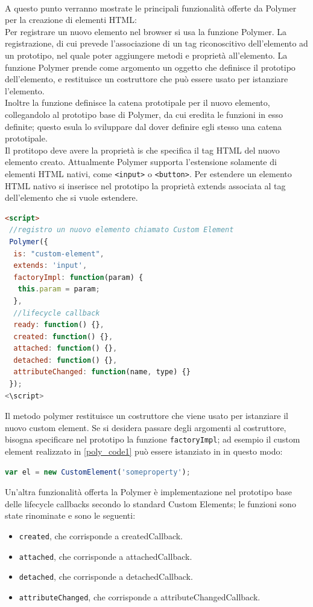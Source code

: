 \\
A questo punto verranno mostrate le principali funzionalità offerte da Polymer per la creazione di elementi HTML:
\\
Per registrare un nuovo elemento nel browser si usa la funzione Polymer. La registrazione, di cui  prevede l’associazione di un tag riconoscitivo dell’elemento ad un prototipo, nel quale poter aggiungere metodi e proprietà all’elemento. La funzione Polymer prende come argomento un oggetto che definisce il prototipo dell’elemento, e restituisce un costruttore che può essere usato per istanziare l’elemento.
\\
Inoltre la funzione definisce la catena prototipale per il nuovo elemento, collegandolo al prototipo base di Polymer, da cui eredita le funzioni in esso definite; questo esula lo sviluppare dal dover definire egli stesso una catena prototipale.
\\
Il protitopo deve avere la proprietà is che specifica il tag HTML del nuovo elemento creato. Attualmente Polymer supporta l’estensione solamente di elementi HTML nativi, come \texttt{<input>} o \texttt{<button>}. Per estendere un elemento HTML nativo si inserisce nel prototipo la proprietà extends associata al tag dell’elemento che si vuole estendere. 
\begin{lstlisting}[language=html, label={poly_code1}]
<script>
 //registro un nuovo elemento chiamato Custom Element
 Polymer({
  is: "custom-element",
  extends: 'input',
  factoryImpl: function(param) {
   this.param = param;
  },
  //lifecycle callback
  ready: function() {},
  created: function() {},
  attached: function() {},
  detached: function() {},
  attributeChanged: function(name, type) {}
 });
<\script>
\end{lstlisting}
Il metodo polymer restituisce un costruttore che viene usato per istanziare il nuovo custom element. Se si desidera passare degli argomenti al costruttore, bisogna specificare nel prototipo la funzione \texttt{factoryImpl}; ad esempio il custom element realizzato in \ref{poly_code1} può essere istanziato in in questo modo:
\begin{lstlisting}[language=javascript]
var el = new CustomElement('someproperty');
\end{lstlisting}
Un’altra funzionalità offerta la Polymer è implementazione nel prototipo base delle lifecycle callbacks secondo lo standard Custom Elements; le funzioni sono state rinominate e sono le seguenti:
\begin{itemize}
\item \texttt{created}, che corrisponde a createdCallback.
\item \texttt{attached}, che corrisponde a attachedCallback.
\item \texttt{detached}, che corrisponde a detachedCallback.
\item \texttt{attributeChanged}, che corrisponde a attributeChangedCallback.
\end{itemize}
